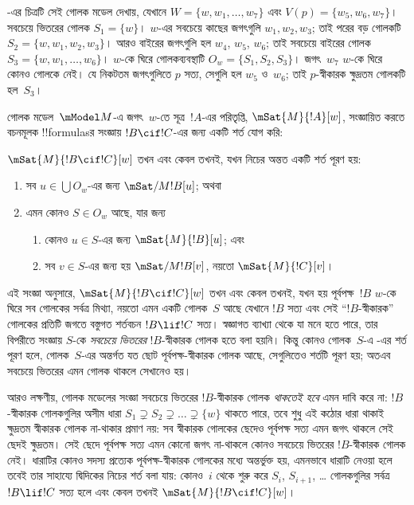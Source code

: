 \documentclass[../../../include/open-logic-section]{subfiles}
\begin{document}
-এর চিত্রটি সেই গোলক মডেল দেখায়, যেখানে
$W = \{w, w_1, \dots, w_7\}$ এবং $V(p) = \{w_5, w_6,
w_7\}$। সবচেয়ে ভিতরের গোলক $S_1 = \{w\}$। $w$-এর সবচেয়ে
কাছের জগৎগুলি $w_1, w_2, w_3$; তাই পরের বড় গোলকটি
$S_2 = \{w, w_1, w_2, w_3\}$। আরও বাইরের জগৎগুলি হল
$w_4$, $w_5$, $w_6$; তাই সবচেয়ে বাইরের গোলক
$S_3 = \{w, w_1, \dots, w_6\}$। $w$-কে ঘিরে গোলকব্যবস্থাটি
$O_w = \{S_1, S_2, S_3\}$। জগৎ~$w_7$ $w$-কে ঘিরে কোনও গোলকে
নেই। যে নিকটতম জগৎগুলিতে $p$ সত্য, সেগুলি হল $w_5$ ও~$w_6$;
তাই $p$-স্বীকারক ক্ষুদ্রতম গোলকটি হল~$S_3$।

গোলক মডেল~$\mModel M$-এ জগৎ~$w$-তে সূত্র~$!A$-এর পরিতৃপ্তি,
$\mSat{M}{!A}[w]$, সংজ্ঞায়িত করতে বচনমূলক !!{formula}sর
সংজ্ঞায় $!B \cif !C$-এর জন্য একটি শর্ত যোগ করি:

\begin{defn}
  $\mSat{M}{!B \cif !C}[w]$ তখন এবং কেবল তখনই, যখন নিচের অন্তত একটি শর্ত পূরণ হয়:
  \begin{enumerate}
  \item{} সব $u \in \bigcup O_w$-এর জন্য
    $\mSat/{M}{!B}[u]$; অথবা
  \item{} এমন কোনও $S \in O_w$ আছে, যার জন্য
    \begin{enumerate}
      \item কোনও $u \in S$-এর জন্য $\mSat{M}{!B}[u]$; এবং
      \item সব $v \in S$-এর জন্য হয় $\mSat/{M}{!B}[v]$, নয়তো
        $\mSat{M}{!C}[v]$।
    \end{enumerate}
  \end{enumerate}
\end{defn}

এই সংজ্ঞা অনুসারে, $\mSat{M}{!B \cif !C}[w]$ তখন এবং কেবল তখনই, যখন হয়
পূর্বপক্ষ~$!B$ $w$-কে ঘিরে সব গোলকের সর্বত্র মিথ্যা, নয়তো
এমন একটি গোলক~$S$ আছে যেখানে $!B$ সত্য এবং সেই
``$!B$-স্বীকারক'' গোলকের প্রতিটি জগতে বস্তুগত শর্তবচন
$!B \lif !C$ সত্য। স্বজ্ঞাগত ব্যাখ্যা থেকে যা মনে হতে পারে,
তার বিপরীতে সংজ্ঞায় $S$-কে \emph{সবচেয়ে ভিতরের}
$!B$-স্বীকারক গোলক হতে বলা হয়নি। কিন্তু কোনও গোলক~$S$-এ
-এর শর্ত পূরণ হলে, গোলক~$S$-এর অন্তর্গত যত ছোট
পূর্বপক্ষ-স্বীকারক গোলক আছে, সেগুলিতেও শর্তটি পূরণ হয়; অতএব
সবচেয়ে ভিতরের এমন গোলক থাকলে সেখানেও হয়।

আরও লক্ষণীয়, গোলক মডেলের সংজ্ঞা সবচেয়ে ভিতরের
$!B$-স্বীকারক গোলক \emph{থাকতেই হবে} এমন দাবি করে না:
$!B$-স্বীকারক গোলকগুলির অসীম ধারা
$S_1 \supsetneq S_2 \supsetneq \dots \supsetneq \{w\}$ থাকতে পারে,
তবে শুধু এই কঠোর ধারা থাকাই ক্ষুদ্রতম স্বীকারক গোলক না-থাকার
প্রমাণ নয়: সব স্বীকারক গোলকের ছেদেও পূর্বপক্ষ সত্য এমন জগৎ
থাকলে সেই ছেদই ক্ষুদ্রতম। সেই ছেদে পূর্বপক্ষ সত্য এমন কোনো
জগৎ না-থাকলে কোনও সবচেয়ে ভিতরের $!B$-স্বীকারক গোলক নেই।
ধারাটির কোনও সদস্য প্রত্যেক পূর্বপক্ষ-স্বীকারক গোলকের মধ্যে
অন্তর্ভুক্ত হয়, এমনভাবে ধারাটি নেওয়া হলে তবেই তার সাহায্যে
দ্বিদিকের নিচের শর্ত বলা যায়: কোনও~$i$ থেকে শুরু করে $S_i$, $S_{i+1}$, \dots
গোলকগুলির সর্বত্র $!B \lif !C$ সত্য হলে এবং কেবল তখনই
$\mSat{M}{!B \cif !C}[w]$।
\end{document}
